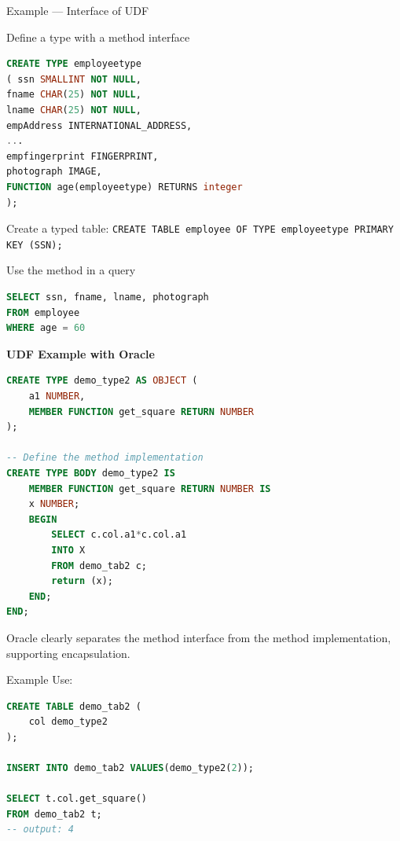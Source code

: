 \documentclass[11pt]{article}
\newenvironment{aside}
  {\begin{mdframed}[style=0,%
      leftline=false,rightline=false,leftmargin=2em,rightmargin=2em,%
          innerleftmargin=0pt,innerrightmargin=0pt,linewidth=0.75pt,%
      skipabove=7pt,skipbelow=7pt]\small}
  {\end{mdframed}}
\newcommand{\boldsecbottom}[1]{
    \textbf{#1}
    \vspace{11pt}
}
\begin{document}
Example --- Interface of UDF

Define a type with a method interface

\vspace{11pt}
\begin{lstlisting}[language=sql, breaklines=true, showstringspaces=false]
CREATE TYPE employeetype
( ssn SMALLINT NOT NULL,
fname CHAR(25) NOT NULL,
lname CHAR(25) NOT NULL,
empAddress INTERNATIONAL_ADDRESS,
...
empfingerprint FINGERPRINT,
photograph IMAGE,
FUNCTION age(employeetype) RETURNS integer
);
\end{lstlisting}
\vspace{11pt}

Create a typed table: \texttt{CREATE TABLE employee OF TYPE employeetype PRIMARY KEY (SSN);}

Use the method in a query

\vspace{11pt}
\begin{lstlisting}[language=sql, breaklines=true, showstringspaces=false]
SELECT ssn, fname, lname, photograph
FROM employee
WHERE age = 60
\end{lstlisting}
\vspace{11pt}

\boldsecbottom{UDF Example with Oracle}
\vspace{11pt}
\begin{lstlisting}[language=sql, breaklines=true, showstringspaces=false]
CREATE TYPE demo_type2 AS OBJECT (
    a1 NUMBER,
    MEMBER FUNCTION get_square RETURN NUMBER
);

-- Define the method implementation
CREATE TYPE BODY demo_type2 IS
    MEMBER FUNCTION get_square RETURN NUMBER IS
    x NUMBER;
    BEGIN
        SELECT c.col.a1*c.col.a1
        INTO X
        FROM demo_tab2 c;
        return (x);
    END;
END;
\end{lstlisting}
\vspace{11pt}

\begin{aside}
    Oracle clearly separates the method interface from the method implementation, supporting encapsulation.
\end{aside}
\vspace{11pt}

Example Use:

\begin{lstlisting}[language=sql, breaklines=true, showstringspaces=false]
CREATE TABLE demo_tab2 (
    col demo_type2
);

INSERT INTO demo_tab2 VALUES(demo_type2(2));

SELECT t.col.get_square()
FROM demo_tab2 t; 
-- output: 4
\end{lstlisting}
\vspace{11pt}
\end{document}
